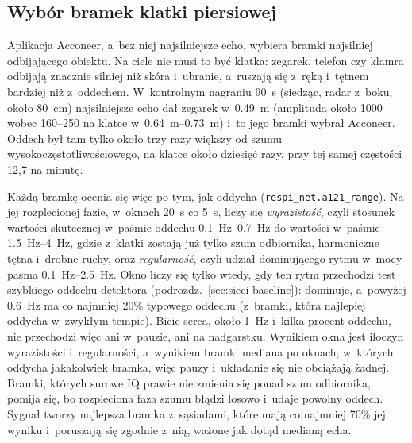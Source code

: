 \documentclass[12pt,a4paper,oneside]{report}
\begin{document}
\subsection{Wybór bramek klatki piersiowej}
\label{sec:sieci-bramki}

Aplikacja Acconeer, a~bez niej najsilniejsze echo, wybiera bramki najsilniej
odbijającego obiektu. Na ciele nie musi to być klatka: zegarek, telefon czy
klamra odbijają znacznie silniej niż skóra i~ubranie, a~ruszają się z~ręką
i~tętnem bardziej niż z~oddechem. W~kontrolnym nagraniu \SI{90}{s} (siedząc,
radar z~boku, około \SI{80}{cm}) najsilniejsze echo dał zegarek
w~\SI{0.49}{m} (amplituda około 1000 wobec 160--250 na klatce
w~\SIrange{0.64}{0.73}{m}) i~to jego bramki wybrał Acconeer. Oddech był tam
tylko około trzy razy większy od szumu wysokoczęstotliwościowego, na klatce
około dziesięć razy, przy tej samej częstości 12,7 na minutę.

Każdą bramkę ocenia się więc po tym, jak oddycha
(\texttt{respi\_net.a121\_range}). Na jej rozplecionej fazie, w~oknach
\SI{20}{s} co \SI{5}{s}, liczy się \emph{wyrazistość}, czyli stosunek
wartości skutecznej w~paśmie oddechu \SIrange{0.1}{0.7}{Hz} do wartości
w~paśmie \SIrange{1.5}{4}{Hz}, gdzie z~klatki zostają już tylko szum
odbiornika, harmoniczne tętna i~drobne ruchy, oraz \emph{regularność}, czyli
udział dominującego rytmu w~mocy pasma \SIrange{0.1}{2.5}{Hz}. Okno liczy się
tylko wtedy, gdy ten rytm przechodzi test szybkiego oddechu detektora
(podrozdz.~\ref{sec:sieci-baseline}): dominuje, a~powyżej \SI{0.6}{Hz} ma co
najmniej 20\% typowego oddechu (z~bramki, która najlepiej oddycha w~zwykłym
tempie). Bicie serca, około \SI{1}{Hz} i~kilka procent oddechu, nie przechodzi
więc ani w~pauzie, ani na nadgarstku. Wynikiem okna jest iloczyn wyrazistości
i~regularności, a~wynikiem bramki mediana po oknach, w~których oddycha
jakakolwiek bramka, więc pauzy i~układanie się nie obciążają żadnej. Bramki,
których surowe IQ prawie nie zmienia się ponad szum odbiornika, pomija się, bo
rozpleciona faza szumu błądzi losowo i~udaje powolny oddech. Sygnał tworzy
najlepsza bramka z~sąsiadami, które mają co najmniej 70\% jej wyniku
i~poruszają się zgodnie z~nią, ważone jak dotąd medianą echa.
\end{document}
